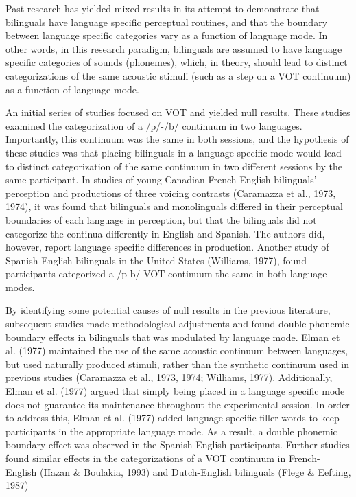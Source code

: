 \documentclass[
  man,floatsintext]{apa6}
\begin{document}
Past research has yielded mixed results in its attempt to demonstrate that bilinguals have language specific perceptual routines, and that the boundary between language specific categories vary as a function of language mode.
In other words, in this research paradigm, bilinguals are assumed to have language specific categories of sounds (phonemes), which, in theory, should lead to distinct categorizations of the same acoustic stimuli (such as a step on a VOT continuum) as a function of language mode.

An initial series of studies focused on VOT and yielded null results.
These studies examined the categorization of a /p/-/b/ continuum in two languages.
Importantly, this continuum was the same in both sessions, and the hypothesis of these studies was that placing bilinguals in a language specific mode would lead to distinct categorization of the same continuum in two different sessions by the same participant.
In studies of young Canadian French-English bilinguals' perception and productions of three voicing contrasts (Caramazza et al., 1973, 1974), it was found that bilinguals and monolinguals differed in their perceptual boundaries of each language in perception, but that the bilinguals did not categorize the continua differently in English and Spanish.
The authors did, however, report language specific differences in production.
Another study of Spanish-English bilinguals in the United States (Williams, 1977), found participants categorized a /p-b/ VOT continuum the same in both language modes.

By identifying some potential causes of null results in the previous literature, subsequent studies made methodological adjustments and found double phonemic boundary effects in bilinguals that was modulated by language mode.
Elman et al. (1977) maintained the use of the same acoustic continuum between languages, but used naturally produced stimuli, rather than the synthetic continuum used in previous studies (Caramazza et al., 1973, 1974; Williams, 1977).
Additionally, Elman et al. (1977) argued that simply being placed in a language specific mode does not guarantee its maintenance throughout the experimental session.
In order to address this, Elman et al. (1977) added language specific filler words to keep participants in the appropriate language mode.
As a result, a double phonemic boundary effect was observed in the Spanish-English participants.
Further studies found similar effects in the categorizations of a VOT continuum in French-English (Hazan \& Boulakia, 1993) and Dutch-English bilinguals (Flege \& Eefting, 1987)
\end{document}
